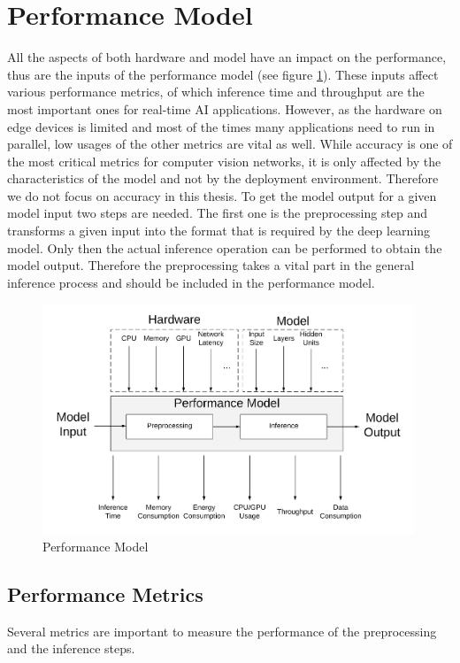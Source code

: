 \section{Performance Model}
All the aspects of both hardware and model have an impact on the performance, thus are the inputs of the performance model (see figure \ref{fig:perfmodel}). These inputs affect various performance metrics, of which inference time and throughput are the most important ones for real-time AI applications. However, as the hardware on edge devices is limited and most of the times many applications need to run in parallel, low usages of the other metrics are vital as well.
While accuracy is one of the most critical metrics for computer vision networks, it is only affected by the characteristics of the model and not by the deployment environment. Therefore we do not focus on accuracy in this thesis.
To get the model output for a given model input two steps are needed. The first one is the preprocessing step and transforms a given input into the format that is required by the deep learning model. Only then the actual inference operation can be performed to obtain the model output. Therefore the preprocessing takes a vital part in the general inference process and should be included in the performance model.
\begin{figure}[H]
\centering
\includegraphics[width=0.99\textwidth]{./Bilder/trade_offs.png}
\caption{Performance Model}
\label{fig:perfmodel}
\end{figure}
\subsection{Performance Metrics}
Several metrics are important to measure the performance of the preprocessing and the inference steps. 
 
